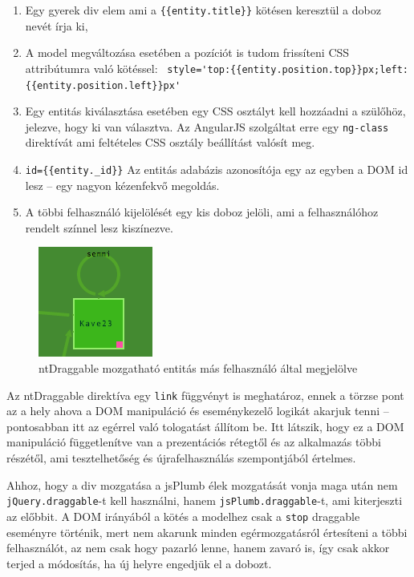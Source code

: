 \begin{enumerate}
\item Egy gyerek div elem ami a \lstinline|{{entity.title}}| kötésen keresztül a doboz nevét írja ki,
\item A model megváltozása esetében a pozíciót is tudom frissíteni CSS attribútumra való kötéssel: \lstinline| style='top:{{entity.position.top}}px;left:{{entity.position.left}}px'|
\item Egy entitás kiválasztása esetében egy CSS osztályt kell hozzáadni a szülőhöz, jelezve, hogy ki van választva. Az AngularJS szolgáltat erre egy \lstinline{ng-class} direktívát ami feltételes CSS osztály beállítást valósít meg. 
\item \lstinline|id={{entity._id}}| Az entitás adabázis azonosítója egy az egyben a DOM id lesz -- egy nagyon kézenfekvő megoldás.
\item A többi felhasználó kijelölését egy kis doboz jelöli, ami a felhasználóhoz rendelt színnel lesz kiszínezve.
\end{enumerate}

\begin{figure}[!ht]
\centering
\includegraphics[keepaspectratio]{figures/entitydirective.png}
\caption{ntDraggable mozgatható entitás más felhasználó által megjelölve}
\label{fig:entitydir}
\end{figure}

Az ntDraggable direktíva egy \lstinline{link} függvényt is meghatároz, ennek a törzse pont az a hely ahova a DOM manipuláció és eseménykezelő logikát akarjuk tenni -- pontosabban itt az egérrel való tologatást állítom be. Itt látszik, hogy ez a DOM manipuláció függetlenítve van a prezentációs rétegtől és az alkalmazás többi részétől, ami tesztelhetőség és újrafelhasználás szempontjából értelmes. 

Ahhoz, hogy a div mozgatása a jsPlumb élek mozgatását vonja maga után nem \lstinline{jQuery.draggable}-t kell használni, hanem \lstinline{jsPlumb.draggable}-t, ami kiterjeszti az előbbit. A DOM irányából a kötés a modelhez csak a \lstinline{stop} draggable eseményre történik, mert nem akarunk minden egérmozgatásról értesíteni a többi felhasználót, az nem csak hogy pazarló lenne, hanem zavaró is, így csak akkor terjed a módosítás, ha új helyre engedjük el a dobozt.


